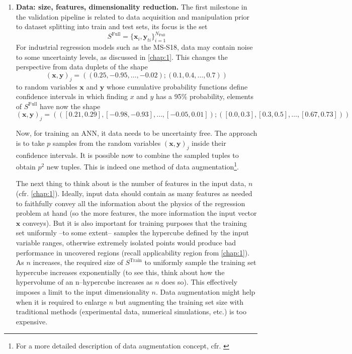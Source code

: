 \begin{enumerate}
	\item\label{item:data}\textbf{Data: size, features, dimensionality reduction.}
	The first milestone in the validation pipeline is related to data acquisition and manipulation prior to dataset splitting into train and test sets, \ie its focus is the set
	$$
	S^\text{Full}=\{\mathbf{x}_i,\mathbf{y}_{ti}\}_{i=1}^{N_{\text{Full}}}
	$$
	For industrial regression models such as the MS-S18, data may contain noise to some uncertainty levels, as discussed in \autoref{chap:1}. This changes the perspective from data duplets of the shape
	$$
	(\mathbf{x},\mathbf{y})_j=((0.25,-0.95,\ldots,-0.02);(0.1,0.4,\ldots,0.7))
	$$ to random variables $\mathbf{x}$ and $\mathbf{y}$ whose cumulative probability functions define confidence intervals in which finding $x$ and $y$ has a 95\% probability, \ie elements of $S^\text{Full}$ have now the shape
	$$
	(\mathbf{x},\mathbf{y})_j=(([0.21,0.29],[-0.98,-0.93],\ldots,[-0.05,0.01]);([0.0,0.3],[0.3,0.5],\ldots,[0.67,0.73]))
	$$
	
	Now, for training an ANN, it data needs to be uncertainty free. The approach is to take $p$ samples from the random variables $(\mathbf{x},\mathbf{y})_j$ inside their confidence intervals. It is possible now to combine the sampled tuples to obtain $p^2$ new tuples. This is indeed one method of data augmentation\footnote{For a more detailed description of data augmentation concept, cfr. \cite{taylor2018improving}}.
	
	The next thing to think about is the number of features in the input data, $n$ (cfr. \autoref{chap:1}). Ideally, input data should contain as many features as needed to faithfully convey all the information about the physics of the regression problem at hand (so the more features, the more information the input vector $\mathbf{x}$ conveys). But it is also important for training purposes that the training set uniformly --to some extent-- samples the hypercube defined by the input variable ranges, otherwise extremely isolated points would produce bad performance in uncovered regions (recall applicability region from \autoref{chap:1}). As $n$ increases, the required size of $S^\text{Train}$ to uniformly sample the training set hypercube increases exponentially (to see this, think about how the hypervolume of an n--hypercube increases as $n$ does so). This effectively imposes a limit to the input dimensionality $n$. Data augmentation might help when it is required to enlarge $n$ but augmenting the training set size with traditional methods (experimental data, numerical simulations, etc.) is too expensive.
	

\end{enumerate}
